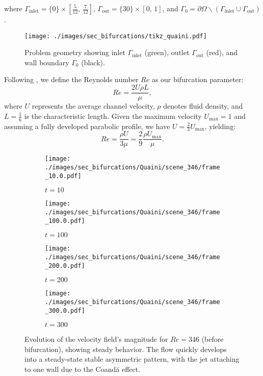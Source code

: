 \documentclass[reqno]{amsart}[standalone]
\theoremstyle{definition}
\theoremstyle{remark}
\begin{document}
where $\Gamma_{\text{inlet}}=\{0\}\times [\frac{5}{12},\,\frac{7}{12}]$, $\Gamma_{\text{out}} = \{30\}\times[0,\, 1]$, and $\Gamma_0 = \partial\Omega\smallsetminus(\Gamma_{\text{inlet}}\cup\Gamma_{\text{out}})$.

\begin{figure}[ht]
    \centering
    \texttt{[image: ./images/sec\_bifurcations/tikz\_quaini.pdf]}
    \caption{Problem geometry showing inlet $\Gamma_\text{inlet}$ (green), outlet $\Gamma_\text{out}$ (red), and wall boundary $\Gamma_0$ (black).}
    \label{figQUAINI}
\end{figure}

Following \parencite{QUAINI}, we define the Reynolds number $Re$ as our bifurcation parameter:
\begin{equation}\label{eq:RE_QUAINI}
Re = \frac{2U\rho L}{\mu},
\end{equation}
where $U$ represents the average channel velocity, $\rho$ denotes fluid density, and $L=\frac{1}{6}$ is the characteristic length. Given the maximum velocity $U_{\text{max}}=1$ and assuming a fully developed parabolic profile, we have $U=\frac{2}{3}U_\text{max}$, yielding:
\begin{equation}\label{eq:RE_QUAINI2}
    Re = \frac{\rho U}{3\mu} = \frac{2}{9}\frac{\rho U_\text{max}}{\mu}.
\end{equation}



\begin{figure}[ht]
\centering

\begin{subfigure}{0.5\linewidth}
\centering
\texttt{[image: ./images/sec\_bifurcations/Quaini/scene\_346/frame\_10.0.pdf]}
\caption{$t=10$}
\end{subfigure}%
\hfill
\begin{subfigure}{0.5\linewidth}
\centering
\texttt{[image: ./images/sec\_bifurcations/Quaini/scene\_346/frame\_100.0.pdf]}
\caption{$t=100$}
\end{subfigure}

%

\begin{subfigure}{0.5\linewidth}
\centering
\texttt{[image: ./images/sec\_bifurcations/Quaini/scene\_346/frame\_200.0.pdf]}
\caption{$t=200$}
\end{subfigure}%
\hfill
\begin{subfigure}{0.5\linewidth}
\centering
\texttt{[image: ./images/sec\_bifurcations/Quaini/scene\_346/frame\_300.0.pdf]}
\caption{$t=300$}
\end{subfigure}

\caption{Evolution of the velocity field's magnitude for $Re=346$ (before bifurcation), showing steady behavior. The flow quickly develops into a steady-state stable asymmetric pattern, with the jet attaching to one wall due to the Coandă effect.}
\label{figEvolutionHopf346}
\end{figure}
\end{document}
